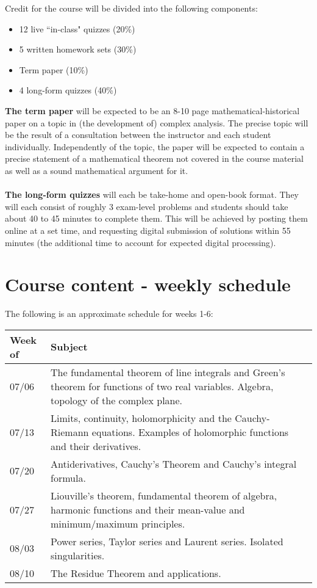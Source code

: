 \documentclass[11pt]{amsart}
\numberwithin{equation}{section}
\begin{document}
\noindent Credit for the course will be divided into the following components:
\begin{itemize}
\item 12 live ``in-class" quizzes (20\%)
\item 5 written homework sets (30\%)
\item Term paper (10\%)
\item 4 long-form quizzes (40\%)
\end{itemize}
\textbf{The term paper} will be expected to be an 8-10 page mathematical-historical paper on a topic in (the development of) complex analysis. The precise topic will be the result of a consultation between the instructor and each student individually. Independently of the topic, the paper will be expected to contain a precise statement of a mathematical theorem not covered in the course material as well as a sound mathematical argument for it.\\
\\
\textbf{The long-form quizzes} will each be take-home and open-book format. They will each consist of roughly 3 exam-level problems and students should take about 40 to 45 minutes to complete them. This will be achieved by posting them online at a set time, and requesting digital submission of solutions within 55 minutes (the additional time to account for expected digital processing).

\section{Course content - weekly schedule}
The following is an approximate schedule for weeks 1-6:

\begin{center}
\begin{tabular}{p{}|p{}}
\hline 
Week of & Subject \\ 
\hline 
07/06 & The fundamental theorem of line integrals and Green's theorem for functions of two real variables. Algebra, topology of the complex plane.  \\ 
\hline 
07/13 & Limits, continuity, holomorphicity and the Cauchy-Riemann equations. Examples of holomorphic functions and their derivatives.  \\ 
\hline 
07/20 & Antiderivatives, Cauchy's Theorem and Cauchy's integral formula. \\ 
\hline 
07/27 & Liouville's theorem, fundamental theorem of algebra, harmonic functions and their mean-value and minimum/maximum principles. \\ 
\hline 
08/03 & Power series, Taylor series and Laurent series. Isolated singularities.  \\ 
\hline 
08/10 & The Residue Theorem and applications.\\ 
\hline 
\end{tabular} 
\end{center}
\end{document}
